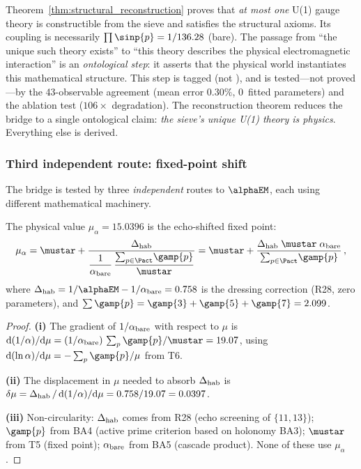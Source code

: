 \documentclass[12pt,a4paper]{article}
\begin{document}
\begin{remark}
\label{rem:ontological_caveat_reconstruction}
Theorem~\ref{thm:structural_reconstruction} proves that \emph{at most one}
U(1) gauge theory is constructible from the sieve and satisfies the structural
axioms.  Its coupling is necessarily $\prod \sinp{p} = 1/136.28$ (bare).
The passage from ``the unique such theory exists'' to ``this theory describes
the physical electromagnetic interaction'' is an \emph{ontological step}:
it asserts that the physical world instantiates this mathematical structure.
This step is tagged \BRIDGETAG{} (not \THMTAG), and is tested---not
proved---by the 43-observable agreement (mean error $0.30\%$, 0~fitted
parameters) and the ablation test ($106\times$ degradation).
The reconstruction theorem reduces the bridge to a single ontological claim:
\emph{the sieve's unique U(1) theory is physics}.  Everything else is derived.
\end{remark}

\subsubsection{Third independent route: fixed-point shift}
\label{sec:ch9_fp_shift}

The bridge is tested by three \emph{independent} routes to
$\alphaEM$, each using different mathematical machinery.

\begin{proposition}
\label{prop:fp_shift}
The physical value $\mu_\alpha = 15.0396$ is the echo-shifted
fixed point:
\begin{equation}
  \mu_\alpha
  = \mustar
  + \frac{\Delta_{\rm hab}}
         {\displaystyle\frac{1}{\alpha_{\rm bare}}\,
          \frac{\sum_{p\in\Pact}\!\gamp{p}}{\mustar}}
  = \mustar
  + \frac{\Delta_{\rm hab}\;\mustar\;\alpha_{\rm bare}}
         {\sum_{p\in\Pact}\!\gamp{p}}\,,
  \label{eq:mu_alpha_shift}
\end{equation}
where $\Delta_{\rm hab} = 1/\alphaEM - 1/\alpha_{\rm bare}
= 0.758$ is the dressing correction (R28, zero parameters),
and $\sum \gamp{p} = \gamp{3}+\gamp{5}+\gamp{7} = 2.099$.
\end{proposition}

\begin{proof}
\textbf{(i)} The gradient of $1/\alpha_{\rm bare}$ with respect
to $\mu$ is
$\mathrm{d}(1/\alpha)/\mathrm{d}\mu
 = (1/\alpha_{\rm bare})\,\sum_p \gamp{p}/\mustar = 19.07$,
using $\mathrm{d}(\ln\alpha)/\mathrm{d}\mu
 = -\sum_p \gamp{p}/\mu$ from T6.

\textbf{(ii)} The displacement in $\mu$ needed to absorb
$\Delta_{\rm hab}$ is $\delta\mu = \Delta_{\rm hab}\,/\,
\mathrm{d}(1/\alpha)/\mathrm{d}\mu = 0.758 / 19.07 = 0.0397$.

\textbf{(iii)} Non-circularity: $\Delta_{\rm hab}$ comes from
R28 (echo screening of $\{11,13\}$); $\gamp{p}$ from BA4 (active prime
criterion based on holonomy BA3); $\mustar$ from T5 (fixed point);
$\alpha_{\rm bare}$ from BA5 (cascade product).  None of these use $\mu_\alpha$.
\end{proof}
\end{document}
